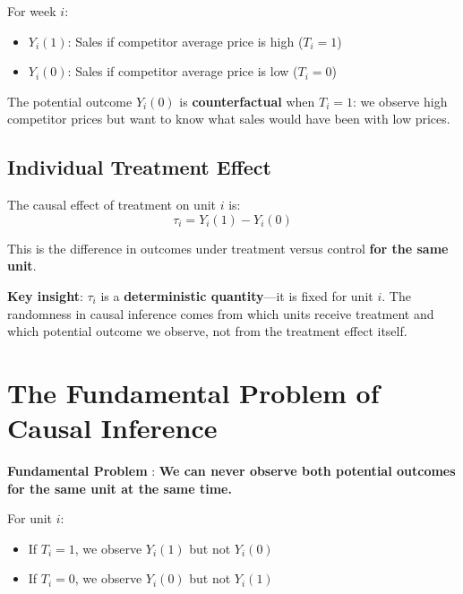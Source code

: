 \begin{example}
\label{ex:insurance_pricing}
For week $i$:
\begin{itemize}
\item $Y_i(1)$: Sales if competitor average price is high ($T_i = 1$)
\item $Y_i(0)$: Sales if competitor average price is low ($T_i = 0$)
\end{itemize}

The potential outcome $Y_i(0)$ is \textbf{counterfactual} when $T_i = 1$: we observe high competitor prices but want to know what sales would have been with low prices.
\end{example}

\subsection{Individual Treatment
Effect}\label{_individual_treatment_effect}

\begin{definition}
\label{def:individual_treatment_effect}
The causal effect of treatment on unit $i$ is:
\[
\tau_i = Y_i(1) - Y_i(0)
\]

This is the difference in outcomes under treatment versus control \textbf{for the same unit}.

\textbf{Key insight}: $\tau_i$ is a \textbf{deterministic quantity}---it is fixed for unit $i$. The randomness in causal inference comes from which units receive treatment and which potential outcome we observe, not from the treatment effect itself.
\end{definition}

\section{The Fundamental Problem of Causal
Inference}\label{_the_fundamental_problem_of_causal_inference}

%
\textbf{Fundamental Problem} \cite{holland1986statistics}:
\textbf{We can never observe both potential outcomes for the same unit
at the same time.}

For unit $i$:
\begin{itemize}
\item If $T_i = 1$, we observe $Y_i(1)$ but not $Y_i(0)$
\item If $T_i = 0$, we observe $Y_i(0)$ but not $Y_i(1)$
\end{itemize}

